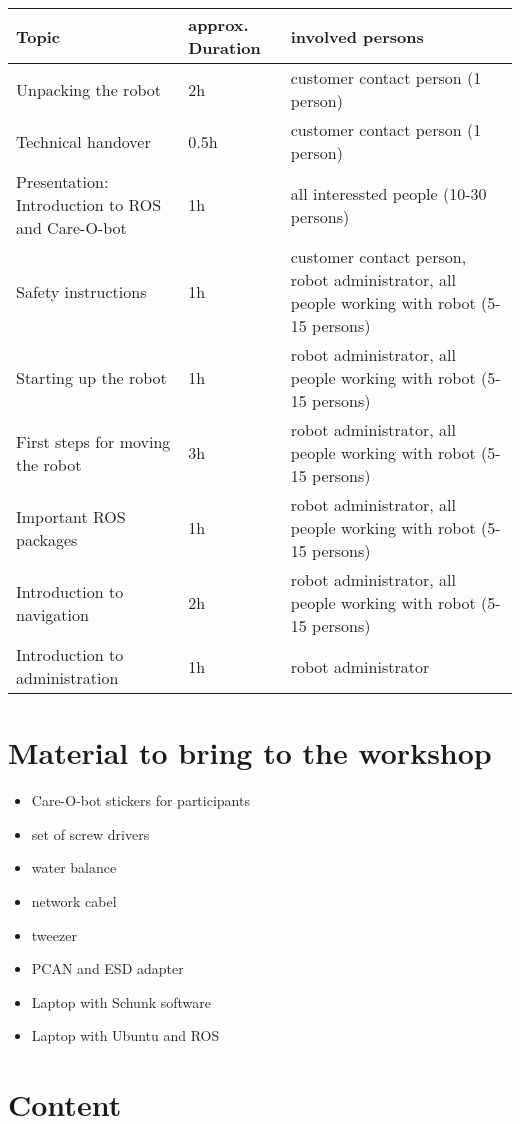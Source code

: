 \documentclass[12pt,twoside]{report}
\begin{document}
\begin{table}[htb]
\begin{tabular}{|l|l|l|}
  \hline
  Topic & approx. Duration & involved persons \\ \hline \hline
  Unpacking the robot & 2h & customer contact person (1 person) \\ \hline
  Technical handover & 0.5h & customer contact person (1 person) \\ \hline
  Presentation: Introduction to ROS and Care-O-bot & 1h & all interessted people (10-30 persons) \\ \hline
  Safety instructions & 1h & customer contact person, robot administrator, all people working with robot (5-15 persons) \\ \hline
  Starting up the robot & 1h & robot administrator, all people working with robot (5-15 persons) \\ \hline
  First steps for moving the robot & 3h & robot administrator, all people working with robot (5-15 persons) \\ \hline
  Important ROS packages & 1h & robot administrator, all people working with robot (5-15 persons) \\ \hline
  Introduction to navigation & 2h & robot administrator, all people working with robot (5-15 persons) \\ \hline
  Introduction to administration & 1h & robot administrator \\ \hline 
  
  
\end{tabular}
\end{table}

\chapter{Material to bring to the workshop}
\begin{itemize}
\item Care-O-bot stickers for participants
\item set of screw drivers
\item water balance
\item network cabel
\item tweezer
\item PCAN and ESD adapter
\item Laptop with Schunk software
\item Laptop with Ubuntu and ROS
\end{itemize}

\chapter{Content}
\end{document}
